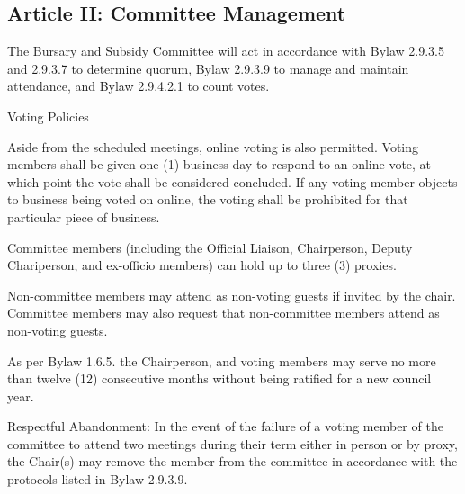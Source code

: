 \subsection{Article II: Committee Management}
\begin{longenum}[ label*=\thesubsection.\arabic*., align=left] 
	\item The Bursary and Subsidy Committee will act in accordance with Bylaw 2.9.3.5 and 2.9.3.7 to determine quorum, Bylaw 2.9.3.9 to manage and maintain attendance, and Bylaw 2.9.4.2.1 to count votes.
	\item Voting Policies
		\begin{longenum}[ label*=\arabic*., align=left] 
		\item Aside from the scheduled meetings, online voting is also permitted. Voting members shall be given one (1) business day to respond to an online vote, at which point the vote shall be considered concluded. If any voting member objects to business being voted on online, the voting shall be prohibited for that particular piece of business.
		\item Committee members (including the Official Liaison, Chairperson, Deputy Chariperson, and ex-officio members) can hold up to three (3) proxies.
		\end{longenum}
	\item Non-committee members may attend as non-voting guests if invited by the chair. Committee members may also request that non-committee members attend as non-voting guests.
	\item As per Bylaw 1.6.5. the Chairperson, and voting members may serve no more than twelve (12) consecutive months without being ratified for a new council year.
	\item Respectful Abandonment: In the event of the failure of a voting member of the committee to attend two meetings during their term either in person or by proxy, the Chair(s) may remove the member from the committee in accordance with the protocols listed in Bylaw 2.9.3.9.
\end{longenum}

